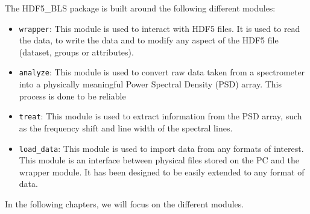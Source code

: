 The HDF5\_BLS package is built around the following different modules:
\begin{itemize}
    \item \texttt{wrapper}: This module is used to interact with HDF5 files. It is used to read the data, to write the data and to modify any aspect of the HDF5 file (dataset, groups or attributes).
    \item \texttt{analyze}: This module is used to convert raw data taken from a spectrometer into a physically meaningful Power Spectral Density (PSD) array. This process is done to be reliable 
    \item \texttt{treat}: This module is used to extract information from the PSD array, such as the frequency shift and line width of the spectral lines. 
    \item \texttt{load\_data}: This module is used to import data from any formats of interest. This module is an interface between physical files stored on the PC and the wrapper module. It has been designed to be easily extended to any format of data.
\end{itemize}

In the following chapters, we will focus on the different modules.